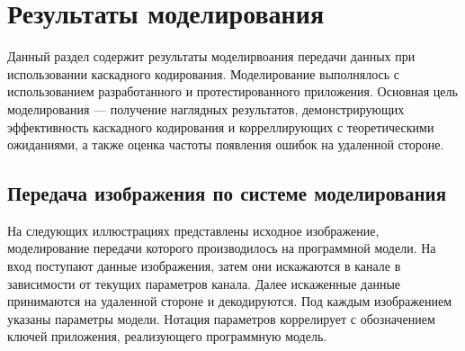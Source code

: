 \chapter{Результаты моделирования}
Данный раздел содержит результаты моделирвоания передачи данных при использовании каскадного
кодирования. Моделирование выполнялось с использованием разработанного и протестированного
приложения. Основная цель моделирования --- получение наглядных результатов, демонстрирующих
эффективность каскадного кодирования и корреллирующих с теоретическими ожиданиями, а также
оценка частоты появления ошибок на удаленной стороне.

\section{Передача изображения по системе моделирования}
На следующих иллюстрациях представлены исходное изображение, моделирование передачи которого
производилось на программной модели. На вход поступают данные изображения, затем они искажаются в канале
в зависимости от текущих параметров канала. Далее искаженные данные принимаются на удаленной стороне и
декодируются. Под каждым изображением указаны параметры модели. Нотация параметров коррелирует с обозначением
ключей приложения, реализующего программную модель.

